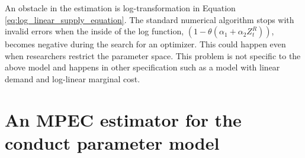 \documentclass[11pt, a4paper]{article}
\begin{document}
An obstacle in the estimation is log-transformation in Equation \eqref{eq:log_linear_supply_equation}.
The standard numerical algorithm stops with invalid errors when the inside of the log function, $(1 - \theta (\alpha_1 + \alpha_2 Z^{R}_{t}))$, becomes negative during the search for an optimizer.
This could happen even when researchers restrict the parameter space.
This problem is not specific to the above model and happens in other specification such as a model with linear demand and log-linear marginal cost.




\section{An MPEC estimator for the conduct parameter model}
\end{document}
